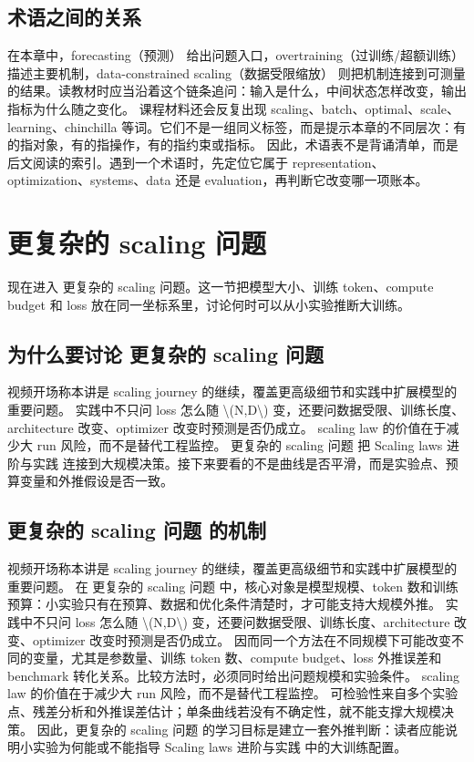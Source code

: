 \documentclass[a4paper]{article}
\begin{document}
\subsection{术语之间的关系}
在本章中，forecasting（预测） 给出问题入口，overtraining（过训练/超额训练） 描述主要机制，data-constrained scaling（数据受限缩放） 则把机制连接到可测量的结果。读教材时应当沿着这个链条追问：输入是什么，中间状态怎样改变，输出指标为什么随之变化。
课程材料还会反复出现 scaling、batch、optimal、scale、learning、chinchilla 等词。它们不是一组同义标签，而是提示本章的不同层次：有的指对象，有的指操作，有的指约束或指标。
因此，术语表不是背诵清单，而是后文阅读的索引。遇到一个术语时，先定位它属于 representation、optimization、systems、data 还是 evaluation，再判断它改变哪一项账本。
\section{更复杂的 scaling 问题}
现在进入 更复杂的 scaling 问题。这一节把模型大小、训练 token、compute budget 和 loss 放在同一坐标系里，讨论何时可以从小实验推断大训练。
\subsection{为什么要讨论 更复杂的 scaling 问题}
视频开场称本讲是 scaling journey 的继续，覆盖更高级细节和实践中扩展模型的重要问题。
实践中不只问 loss 怎么随 \textbackslash{}(N,D\textbackslash{}) 变，还要问数据受限、训练长度、architecture 改变、optimizer 改变时预测是否仍成立。
scaling law 的价值在于减少大 run 风险，而不是替代工程监控。
更复杂的 scaling 问题 把 Scaling laws 进阶与实践 连接到大规模决策。接下来要看的不是曲线是否平滑，而是实验点、预算变量和外推假设是否一致。
\subsection{更复杂的 scaling 问题 的机制}
视频开场称本讲是 scaling journey 的继续，覆盖更高级细节和实践中扩展模型的重要问题。 在 更复杂的 scaling 问题 中，核心对象是模型规模、token 数和训练预算：小实验只有在预算、数据和优化条件清楚时，才可能支持大规模外推。
实践中不只问 loss 怎么随 \textbackslash{}(N,D\textbackslash{}) 变，还要问数据受限、训练长度、architecture 改变、optimizer 改变时预测是否仍成立。 因而同一个方法在不同规模下可能改变不同的变量，尤其是参数量、训练 token 数、compute budget、loss 外推误差和 benchmark 转化关系。比较方法时，必须同时给出问题规模和实验条件。
scaling law 的价值在于减少大 run 风险，而不是替代工程监控。 可检验性来自多个实验点、残差分析和外推误差估计；单条曲线若没有不确定性，就不能支撑大规模决策。
因此，更复杂的 scaling 问题 的学习目标是建立一套外推判断：读者应能说明小实验为何能或不能指导 Scaling laws 进阶与实践 中的大训练配置。
\end{document}
